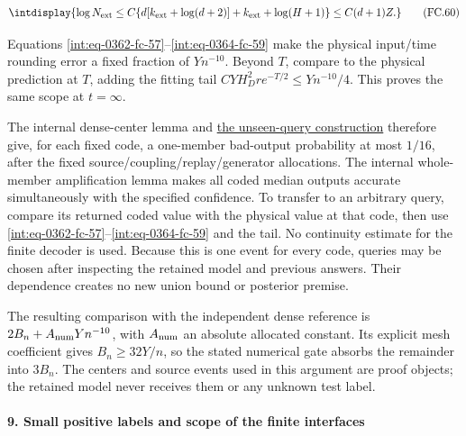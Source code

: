 \begingroup\renewcommand{\theHequation}{intdisplay.766}
\begin{equation}
\intdisplay{
\log N_{\rm ext}\le
C\{d[k_{\rm ext}+\log(d+2)]+k_{\rm ext}+\log(H+1)\}
\le C(d+1)Z.
}
\tag{FC.60}
\label{int:eq-0365-fc-60}
\end{equation}
\endgroup


Equations \eqref{int:eq-0362-fc-57}--\allowbreak \eqref{int:eq-0364-fc-59} make the physical input/time rounding error a fixed fraction of \(Yn^{-10}\). Beyond \(T\), compare to the physical prediction at \(T\), adding the fitting tail \(CYH_D^2r e^{-T/2}\le Yn^{-10}/4\). This proves the same scope at \(t=\infty\).



The internal dense-center lemma and \hyperref[int:decoder-passive-query]{the unseen-query construction} therefore give, for each fixed code, a one-member bad-output probability at most \(1/16\), after the fixed source/coupling/replay/generator allocations. The internal whole-member amplification lemma makes all coded median outputs accurate simultaneously with the specified confidence. To transfer to an arbitrary query, compare its returned coded value with the physical value at that code, then use \eqref{int:eq-0362-fc-57}--\allowbreak \eqref{int:eq-0364-fc-59} and the tail. No continuity estimate for the finite decoder is used. Because this is one event for every code, queries may be chosen after inspecting the retained model and previous answers. Their dependence creates no new union bound or posterior premise.



The resulting comparison with the independent dense reference is \(2B_n+A_{\rm num}Yn^{-10}\), with \(A_{\rm num}\) an absolute allocated constant. Its explicit mesh coefficient gives \(B_n\ge32Y/n\), so the stated numerical gate absorbs the remainder into \(3B_n\). The centers and source events used in this argument are proof objects; the retained model never receives them or any unknown test label.


\paragraph{9. Small positive labels and scope of the finite interfaces}

\mbox{}\par\smallskip

